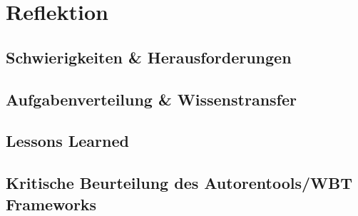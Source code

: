 \documentclass{article}
\begin{document}
\section{Reflektion}
\label{sec:reflektion}

\subsection{Schwierigkeiten \& Herausforderungen}


\subsection{Aufgabenverteilung \& Wissenstransfer}


\subsection{Lessons Learned}

\subsection{Kritische Beurteilung des Autorentools/WBT Frameworks}



%

\end{document}
